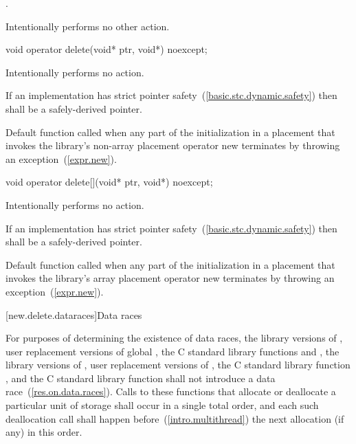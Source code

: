 \begin{itemdescr}
\pnum
\returns
{}.

\pnum
\notes
Intentionally performs no other action.
\end{itemdescr}

%
\begin{itemdecl}
void operator delete(void* ptr, void*) noexcept;
\end{itemdecl}

\begin{itemdescr}
\pnum
\effects
Intentionally performs no action.

\pnum
\requires
If an implementation has strict pointer safety~(\ref{basic.stc.dynamic.safety})
then  shall be a safely-derived pointer.

\pnum
\notes
Default function called when any part of the initialization in a
placement  that invokes the library's
non-array placement operator new
terminates by throwing an exception~(\ref{expr.new}).
\end{itemdescr}

%
\begin{itemdecl}
void operator delete[](void* ptr, void*) noexcept;
\end{itemdecl}

\begin{itemdescr}
\pnum
\effects
Intentionally performs no action.

\pnum
\requires
If an implementation has strict pointer safety~(\ref{basic.stc.dynamic.safety})
then  shall be a safely-derived pointer.

\pnum
\notes
Default function called when any part of the initialization in a
placement  that invokes the library's
array placement operator new
terminates by throwing an exception~(\ref{expr.new}).
\end{itemdescr}

[new.delete.dataraces]{Data races}

\pnum
For purposes of determining the existence of data races, the library versions
of , user replacement versions of global ,
the C standard library functions  and , the library
versions of , user replacement
versions of , the C standard library function
, and the C standard library function  shall not
introduce a data race~(\ref{res.on.data.races}).
Calls to these functions that allocate or deallocate a particular unit
of storage shall occur in a single total order, and each such deallocation call
shall happen before~(\ref{intro.multithread}) the next allocation (if any) in
this order.

